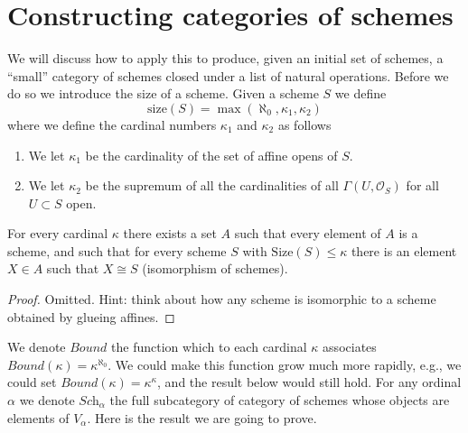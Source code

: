 \section{Constructing categories of schemes}
\label{section-fibre-product-schemes}

\noindent
We will discuss how to apply this to produce, given an initial
set of schemes, a ``small'' category of schemes closed under
a list of natural operations. Before we do so we introduce the
size of a scheme. Given a scheme $S$ we define
$$
\text{size}(S) = \max(\aleph_0, \kappa_1, \kappa_2)
$$
where we define the cardinal numbers $\kappa_1$ and $\kappa_2$ as follows
\begin{enumerate}
\item We let $\kappa_1$ be the cardinality of the set of affine opens of $S$.
\item We let $\kappa_2$ be the supremum of all the cardinalities of
all $\Gamma(U, \mathcal{O}_S)$ for all $U \subset S$ open.
\end{enumerate}

\begin{lemma}
\label{lemma-bounded-size}
For every cardinal $\kappa$ there exists a set $A$ such
that every element of $A$ is a scheme, and such that for every
scheme $S$ with $\text{Size}(S) \leq \kappa$ there is
an element $X \in A$ such that $X \cong S$ (isomorphism
of schemes).
\end{lemma}

\begin{proof}
Omitted. Hint: think about how any scheme is isomorphic to a scheme
obtained by glueing affines.
\end{proof}

\noindent
We denote $Bound$ the function which to each
cardinal $\kappa$ associates $Bound(\kappa) = \kappa^{\aleph_0}$.
We could make this function grow much more rapidly, e.g., we could
set $Bound(\kappa) = \kappa^\kappa$, and the result below would still hold.
For any ordinal $\alpha$ we denote $\textit{Sch}_\alpha$ the full
subcategory of category of schemes whose objects are elements of
$V_\alpha$. Here is the result we are going to prove.

